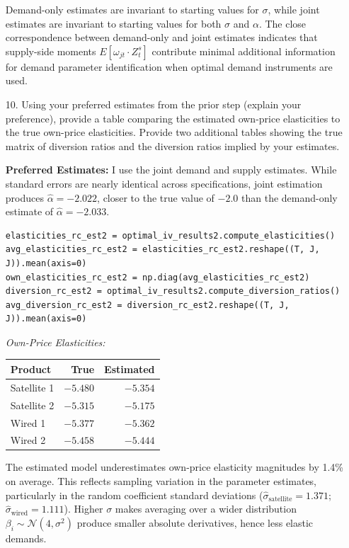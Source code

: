 \documentclass[english,11pt]{article}
\begin{document}
\begin{enumerate}
Demand-only estimates are invariant to starting values for $\sigma$, while joint estimates are invariant to starting values for both $\sigma$ and $\alpha$. The close correspondence between demand-only and joint estimates indicates that supply-side moments $E[\omega_{jt} \cdot Z_t^s]$ contribute minimal additional information for demand parameter identification when optimal demand instruments are used.


\item[10.] Using your preferred estimates from the prior step (explain your
preference), provide a table comparing the estimated own-price elasticities
to the true own-price elasticities. Provide two additional tables showing
the true matrix of diversion ratios and the diversion ratios implied by your
estimates.

\textbf{Preferred Estimates:} I use the joint demand and supply estimates. While standard errors are nearly identical across specifications, joint estimation produces $\hat{\alpha} = -2.022$, closer to the true value of $-2.0$ than the demand-only estimate of $\hat{\alpha} = -2.033$.


\begin{verbatim}
elasticities_rc_est2 = optimal_iv_results2.compute_elasticities()
avg_elasticities_rc_est2 = elasticities_rc_est2.reshape((T, J, J)).mean(axis=0)
own_elasticities_rc_est2 = np.diag(avg_elasticities_rc_est2)
diversion_rc_est2 = optimal_iv_results2.compute_diversion_ratios()
avg_diversion_rc_est2 = diversion_rc_est2.reshape((T, J, J)).mean(axis=0)
\end{verbatim}


\textit{Own-Price Elasticities:}

\begin{center}
\begin{tabular}{lrr}
\hline
Product & True & Estimated \\
\hline
Satellite 1 & $-5.480$ & $-5.354$ \\
Satellite 2 & $-5.315$ & $-5.175$ \\
Wired 1 & $-5.377$ & $-5.362$ \\
Wired 2 & $-5.458$ & $-5.444$ \\
\hline
\end{tabular}
\end{center}

The estimated model underestimates own-price elasticity magnitudes by 1.4\% on average. This reflects sampling variation in the parameter estimates, particularly in the random coefficient standard deviations ($\hat{\sigma}_{\text{satellite}} = 1.371$; $\hat{\sigma}_{\text{wired}} = 1.111$). Higher $\sigma$ makes averaging over a wider distribution $\beta_i \sim \mathcal{N}(4, \sigma^2)$ produce smaller absolute derivatives, hence less elastic demands.


\end{enumerate}
\end{document}
